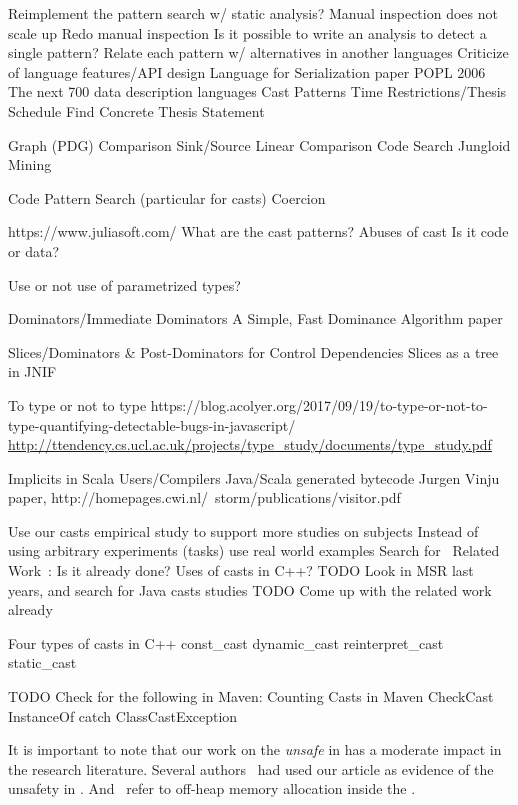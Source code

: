Reimplement the pattern search w/ static analysis?
Manual inspection does not scale up
Redo manual inspection
Is it possible to write an analysis to detect a single pattern?
Relate each pattern w/ alternatives in another languages
Criticize of language features/API design
Language for Serialization paper POPL 2006
The next 700 data description languages
Cast Patterns
Time Restrictions/Thesis Schedule
Find Concrete Thesis Statement


Graph (PDG) Comparison
Sink/Source
Linear Comparison
Code Search
Jungloid Mining

Code Pattern Search (particular for casts)
Coercion

https://www.juliasoft.com/
What are the cast patterns?
Abuses of cast
Is it code or data?

Use or not use of parametrized types?

Dominators/Immediate Dominators
A Simple, Fast Dominance Algorithm paper



Slices/Dominators \& Post-Dominators for Control Dependencies
Slices as a tree in JNIF

To type or not to type
https://blog.acolyer.org/2017/09/19/to-type-or-not-to-type-quantifying-detectable-bugs-in-javascript/
\url{http://ttendency.cs.ucl.ac.uk/projects/type_study/documents/type_study.pdf}

Implicits in Scala
Users/Compilers Java/Scala generated bytecode
Jurgen Vinju paper, http://homepages.cwi.nl/~storm/publications/visitor.pdf

Use our casts empirical study to support more studies on subjects
Instead of using arbitrary experiments (tasks) use real world examples
Search for ~Related Work~: Is it already done?
Uses of casts in C++?
TODO Look in MSR last years, and search for Java casts studies
TODO Come up with the related work already

Four types of casts in C++
const\_cast
dynamic\_cast
reinterpret\_cast
static\_cast

TODO Check for the following in Maven:
Counting Casts in Maven
CheckCast
InstanceOf
catch ClassCastException


It is important to note that our work on the \emph{unsafe} \api{} in \java{} has a moderate impact in the research literature.
Several authors~
\cite{staicu_understanding_2017,jiang_unsupervised_2017,zhang_accepting_2016,saied_cooperative_2016,hora_when_2016,li_accessing_2016,holzinger_-depth_2016} had used our article as evidence of the unsafety in \java{}.
And~\cite{bruno_ng2c:_2017} refer to off-heap memory allocation inside the \jvm{}.

